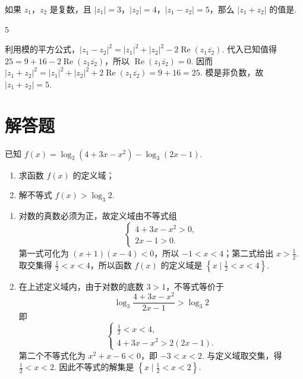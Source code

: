 \begin{problem}
如果 \(z_1\)，\(z_2\) 是复数，且 \(\left| z_1 \right|=3\)，\(\left| z_2 \right|=4\)，\(\left| z_1-z_2 \right|=5\)，那么 \(\left| z_1+z_2 \right|\) 的值是\fillinblank{}.
\end{problem}

\begin{answer}
\(5\)
\end{answer}

\begin{solution}
利用模的平方公式，\(\left|z_1-z_2\right|^2=|z_1|^2+|z_2|^2-2\operatorname{Re}(z_1\overline{z_2})\). 代入已知值得 \(25=9+16-2\operatorname{Re}(z_1\overline{z_2})\)，所以 \(\operatorname{Re}(z_1\overline{z_2})=0\). 因而 \(\left|z_1+z_2\right|^2=|z_1|^2+|z_2|^2+2\operatorname{Re}(z_1\overline{z_2})=9+16=25\). 模是非负数，故 \(\left|z_1+z_2\right|=5\).
\end{solution}

\section{解答题}

\begin{problem}
已知 \(f(x)=\log_3\left( 4+3x-x^2 \right)-\log_3\left( 2x-1 \right)\).

\begin{enumerate}
\item 求函数 \(f(x)\) 的定义域；
\item 解不等式 \(f(x)>\log_3 2\).
\end{enumerate}
\end{problem}

\begin{solution}
\begin{enumerate}
\item 对数的真数必须为正，故定义域由不等式组
\[
\begin{cases}
4+3x-x^2>0,\\
2x-1>0.
\end{cases}
\]
第一式可化为 \((x+1)(x-4)<0\)，所以 \(-1<x<4\)；第二式给出 \(x>\frac12\). 取交集得 \(\frac12<x<4\)，所以函数 \(f(x)\) 的定义域是 \(\left\{x\mid\frac12<x<4\right\}\).

\item 在上述定义域内，由于对数的底数 \(3>1\)，不等式等价于
\[
\log_3\frac{4+3x-x^2}{2x-1}>\log_3 2
\]
即
\[
\begin{cases}
\frac{1}{2}<x<4,\\
4+3x-x^2>2(2x-1).
\end{cases}
\]
第二个不等式化为 \(x^2+x-6<0\)，即 \(-3<x<2\). 与定义域取交集，得 \(\frac12<x<2\). 因此不等式的解集是 \(\left\{x\mid\frac12<x<2\right\}\).
\end{enumerate}
\end{solution}

